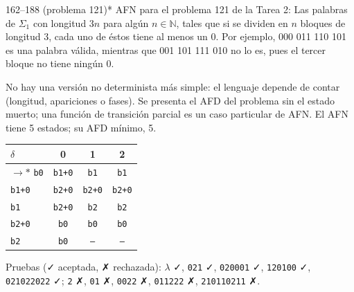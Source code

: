 \documentclass[11pt]{article}
\begin{document}
\begin{ejercicio}{162--188 (problema 121)}{*}
AFN para el problema 121 de la Tarea 2: Las palabras de $\Sigma_1$ con longitud $3n$ para algún $n \in \mathbb{N}$, tales que si se dividen en $n$ bloques de longitud 3, cada uno de éstos tiene al menos un 0. Por ejemplo, 000 011 110 101 es una palabra válida, mientras que 001 101 111 010 no lo es, pues el tercer bloque no tiene ningún 0.
\end{ejercicio}
\proc No hay una versión no determinista más simple: el lenguaje depende de contar (longitud, apariciones o fases). Se presenta el AFD del problema sin el estado muerto; una función de transición parcial es un caso particular de AFN. El AFN tiene 5 estados; su AFD mínimo, 5.
\begin{center}\small\begin{tabular}{lccc}\toprule
$\delta$ & 0 & 1 & 2 \\\midrule
$\to$$*$ \texttt{b0} & \texttt{b1+0} & \texttt{b1} & \texttt{b1} \\
 \texttt{b1+0} & \texttt{b2+0} & \texttt{b2+0} & \texttt{b2+0} \\
 \texttt{b1} & \texttt{b2+0} & \texttt{b2} & \texttt{b2} \\
 \texttt{b2+0} & \texttt{b0} & \texttt{b0} & \texttt{b0} \\
 \texttt{b2} & \texttt{b0} & \texttt{--} & \texttt{--} \\
\bottomrule\end{tabular}\end{center}
Pruebas (✓ aceptada, ✗ rechazada): $\lambda$ ✓, \texttt{021} ✓, \texttt{020001} ✓, \texttt{120100} ✓, \texttt{021022022} ✓; \texttt{2} ✗, \texttt{01} ✗, \texttt{0022} ✗, \texttt{011222} ✗, \texttt{210110211} ✗.
\end{document}
